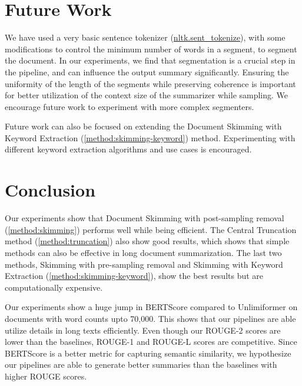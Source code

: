 \section{Future Work}
\label{sec:future-work}

We have used a very basic sentence tokenizer
(\href{https://www.nltk.org/api/nltk.tokenize.sent_tokenize.html}{nltk.sent\_tokenize}),
with some modifications to control the minimum number of words in a segment,
to segment the document.
In our experiments, we find that segmentation is a crucial step in the pipeline, and can
influence the output summary significantly.
Ensuring the uniformity of the length of the segments while preserving coherence is
important for better utilization of the context size of the summarizer while sampling.
We encourage future work to experiment with more complex segmenters.

Future work can also be focused on extending the Document Skimming with Keyword Extraction
(\ref{method:skimming-keyword}) method.
Experimenting with different keyword extraction algorithms and use cases is encouraged.


\section{Conclusion}
\label{sec:conclusion}

Our experiments show that Document Skimming with post-sampling removal (\ref{method:skimming})
performs well while being efficient.
The Central Truncation method (\ref{method:truncation}) also show good results, which shows
that simple methods can also be effective in long document summarization.
The last two methods, Skimming with pre-sampling removal and Skimming with Keyword Extraction
(\ref{method:skimming-keyword}), show the best results but are computationally expensive.

Our experiments show a huge jump in BERTScore compared to Unlimiformer on
documents with word counts upto 70,000.
This shows that our pipelines are able utilize details in long texts efficiently.
Even though our ROUGE-2 scores are lower than the baselines, ROUGE-1 and ROUGE-L
scores are competitive.
Since BERTScore is a better metric for capturing semantic similarity, we hypothesize
our pipelines are able to generate better summaries than the baselines with higher
ROUGE scores.
